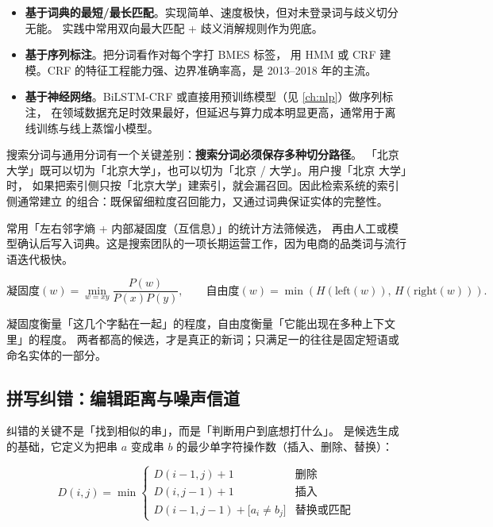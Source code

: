\begin{itemize}
  \item \textbf{基于词典的最短/最长匹配}。实现简单、速度极快，但对未登录词与歧义切分无能。
        实践中常用双向最大匹配 + 歧义消解规则作为兜底。
  \item \textbf{基于序列标注}。把分词看作对每个字打 BMES 标签，
        用 HMM 或 CRF\cite{lafferty2001crf} 建模。CRF 的特征工程能力强、边界准确率高，是 2013--2018 年的主流。
  \item \textbf{基于神经网络}。BiLSTM-CRF 或直接用预训练模型（见 \cref{ch:nlp}）做序列标注，
        在领域数据充足时效果最好，但延迟与算力成本明显更高，通常用于离线训练与线上蒸馏小模型。
\end{itemize}

搜索分词与通用分词有一个关键差别：\textbf{搜索分词必须保存多种切分路径}。
「北京大学」既可以切为「北京大学」，也可以切为「北京 / 大学」。用户搜「北京 大学」时，
如果把索引侧只按「北京大学」建索引，就会漏召回。因此检索系统的索引侧通常建立
的组合：既保留细粒度召回能力，又通过词典保证实体的完整性。

 常用「左右邻字熵 + 内部凝固度（互信息）」的统计方法筛候选，
再由人工或模型确认后写入词典。这是搜索团队的一项长期运营工作，因为电商的品类词与流行语迭代极快。

\begin{equation}
\text{凝固度}(w) = \min_{w = xy} \frac{P(w)}{P(x) P(y)} ,
\qquad \text{自由度}(w) = \min\left( H(\text{left}(w)),\, H(\text{right}(w)) \right) .
\label{eq:newword}
\end{equation}

凝固度衡量「这几个字黏在一起」的程度，自由度衡量「它能出现在多种上下文里」的程度。
两者都高的候选，才是真正的新词；只满足一的往往是固定短语或命名实体的一部分。

\subsection{拼写纠错：编辑距离与噪声信道}

纠错的关键不是「找到相似的串」，而是「判断用户到底想打什么」。
是候选生成的基础，它定义为把串 $a$ 变成串 $b$ 的最少单字符操作数（插入、删除、替换）：

\begin{equation}
D(i, j) = \min \begin{cases}
D(i-1, j) + 1 & \text{删除} \\
D(i, j-1) + 1 & \text{插入} \\
D(i-1, j-1) + \big[ a_i \ne b_j \big] & \text{替换或匹配}
\end{cases}
\label{eq:editdist}
\end{equation}

